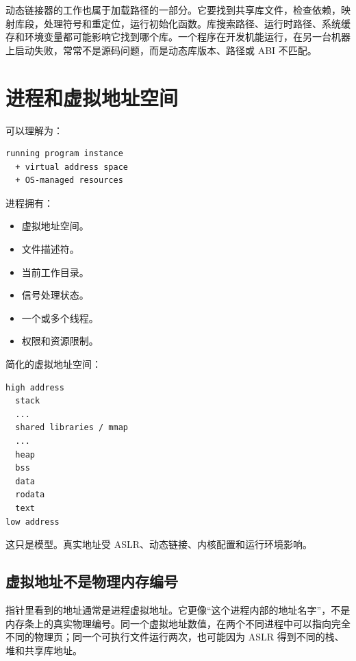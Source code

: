 动态链接器的工作也属于加载路径的一部分。它要找到共享库文件，检查依赖，映射库段，处理符号和重定位，运行初始化函数。库搜索路径、运行时路径、系统缓存和环境变量都可能影响它找到哪个库。一个程序在开发机能运行，在另一台机器上启动失败，常常不是源码问题，而是动态库版本、路径或 ABI 不匹配。

\section{进程和虚拟地址空间}

 可以理解为：

\begin{center}
\begin{minipage}{0.75\linewidth}
\begin{verbatim}
running program instance
  + virtual address space
  + OS-managed resources
\end{verbatim}
\end{minipage}
\end{center}

进程拥有：

\begin{itemize}
  \item 虚拟地址空间。
  \item 文件描述符。
  \item 当前工作目录。
  \item 信号处理状态。
  \item 一个或多个线程。
  \item 权限和资源限制。
\end{itemize}

简化的虚拟地址空间：

\begin{center}
\begin{minipage}{0.5\linewidth}
\begin{verbatim}
high address
  stack
  ...
  shared libraries / mmap
  ...
  heap
  bss
  data
  rodata
  text
low address
\end{verbatim}
\end{minipage}
\end{center}

这只是模型。真实地址受 ASLR、动态链接、内核配置和运行环境影响。

\subsection{虚拟地址不是物理内存编号}

指针里看到的地址通常是进程虚拟地址。它更像“这个进程内部的地址名字”，不是内存条上的真实物理编号。同一个虚拟地址数值，在两个不同进程中可以指向完全不同的物理页；同一个可执行文件运行两次，也可能因为 ASLR 得到不同的栈、堆和共享库地址。

